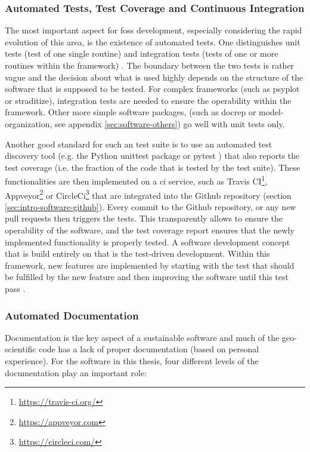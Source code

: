 \begin{refsection}
\subsubsection{Automated Tests, Test Coverage and Continuous Integration} \label{sec:intro-software-ci}
The most important aspect for \gls{foss} development, especially considering the rapid evolution of this area, is the existence of automated tests. One distinguishes unit tests (test of one single routine) and integration tests (tests of one or more routines within the framework) \citep{Shaw2018}. The boundary between the two tests is rather vague and the decision about what is used highly depends on the structure of the software that is supposed to be tested. For complex frameworks (such as psyplot or straditize), integration tests are needed to ensure the operability within the framework. Other more simple software packages, (such as docrep or model-organization, see appendix \ref{sec:software-others}) go well with unit tests only.

Another good standard for such an test suite is to use an automated test discovery tool (e.g. the Python unittest package \citep{PSF2019} or pytest \citep{KrekelOliveiraPfannschmidtEtAl2004}) that also reports the test coverage (i.e. the fraction of the code that is tested by the test suite). These functionalities are then implemented on a \gls{ci} service, such as Travis CI\footnote{\url{https://travis-ci.org/}}, Appveyor\footnote{\url{https://appveyor.com}} or CircleCi\footnote{\url{https://circleci.com/}} that are integrated into the Github repository (section \ref{sec:intro-software-github}). Every commit to the Github repository, or any new pull requests then triggers the tests. This transparently allows to ensure the operability of the software, and the test coverage report ensures that the newly implemented functionality is properly tested. A software development concept that is build entirely on that is the test-driven development. Within this framework, new features are implemented by starting with the test that should be fulfilled by the new feature and then improving the software until this test pass \citep{Beck2002}.


\subsubsection{Automated Documentation} \label{sec:intro-software-docs}
Documentation is the key aspect of a sustainable software and much of the geo-scientific code has a lack of proper documentation (based on personal experience). For the software in this thesis, four different levels of the documentation play an important role:


\end{refsection}
